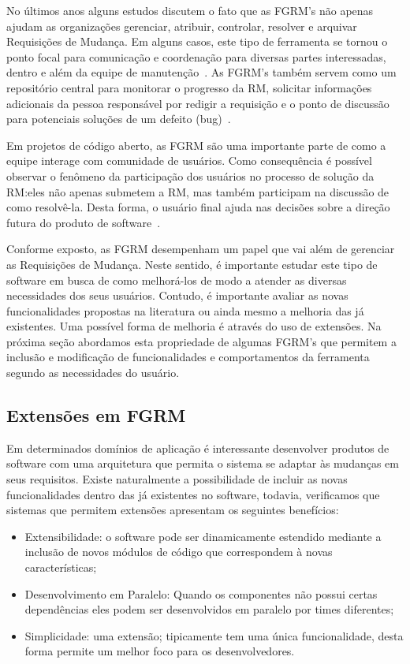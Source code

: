 No últimos anos alguns estudos discutem o fato que as FGRM's não apenas ajudam
as organizações gerenciar, atribuir, controlar, resolver e arquivar Requisições
de Mudança. Em alguns casos, este tipo de ferramenta se tornou o ponto focal
para comunicação e coordenação para diversas partes interessadas, dentro e além
da equipe de manutenção~\cite{Bertram:2010:CCB:1718918.1718972}.  As FGRM's
também servem como um repositório central para monitorar o progresso da RM,
solicitar informações adicionais da pessoa responsável por redigir a requisição
e o ponto de discussão para potenciais soluções de um defeito
(bug)~\cite{zimmermann2009improving}.

Em projetos de código aberto, as FGRM são uma importante parte de como a equipe
interage com comunidade de usuários. Como consequência é possível observar o
fenômeno da participação dos usuários no processo de solução da RM:\@ eles não
apenas submetem a RM, mas também participam na discussão de como resolvê-la.
Desta forma, o usuário final ajuda nas decisões sobre a direção futura do
produto de software~\cite{breu2010information}.

Conforme exposto, as FGRM desempenham um papel que vai além de gerenciar as
Requisições de Mudança.  Neste sentido, é importante estudar este tipo de
software em busca de como melhorá-los de modo a atender as diversas necessidades
dos seus usuários. Contudo, é importante avaliar as novas funcionalidades
propostas na li\-te\-ra\-tu\-ra ou ainda mesmo a melhoria das já existentes. Uma
possível forma de melhoria é através do uso de extensões. Na próxima seção
abordamos esta propriedade de algumas FGRM's que permitem a inclusão e
modificação de funcionalidades e comportamentos da ferramenta segundo as
necessidades do usuário.

\subsection{Extensões em FGRM}
\label{subsec:extensoes_fgrm}

Em determinados domínios de aplicação é interessante desenvolver produtos de
software com uma arquitetura que permita o sistema se adaptar às mudanças em
seus requisitos. Existe naturalmente a possibilidade de incluir as novas
funcionalidades dentro das já existentes no software, todavia, verificamos que
sistemas que permitem extensões apresentam os seguintes benefícios:

\begin{itemize}
	\item Extensibilidade: o software pode ser dinamicamente estendido mediante
		a inclusão de novos módulos de código que correspondem à novas
		características;
	\item Desenvolvimento em Paralelo: Quando os componentes não possui certas
		dependências eles podem ser desenvolvidos em paralelo por times
		diferentes;
	\item Simplicidade: uma  extensão; tipicamente tem uma única funcionalidade,
		desta forma permite um melhor foco para os desenvolvedores.
\end{itemize}

